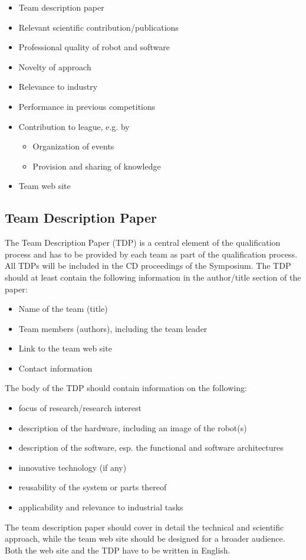 \begin{itemize}

	\item Team description paper
	\item Relevant scientific contribution/publications
	\item Professional quality of robot and software
	\item Novelty of approach
	\item Relevance to industry
	\item Performance in previous competitions
	\item Contribution to \RCAW league, e.g. by
		\begin{itemize}
			\item Organization of events
			\item Provision and sharing of knowledge
		\end{itemize}
	\item Team web site

\end{itemize}

\subsection{Team Description Paper}
The Team Description Paper (TDP) is a central element of the qualification process and has to be provided by each team as part of the qualification process. All TDPs will be included in the CD  proceedings of the \RC Symposium. The TDP should at least contain the following information in the author/title section of the paper:

\begin{itemize}
	\item Name of the team (title)
	\item Team members (authors), including the team leader
	\item Link to the team web site
	\item Contact information
\end{itemize}


The body of the TDP should contain information on the following:

\begin{itemize}
	\item focus of research/research interest
	\item description of the hardware, including an image of the robot(s)
	\item description of the software, esp. the functional and software architectures
	\item innovative technology (if any)
	\item reusability of the system or parts thereof
	\item applicability and relevance to industrial tasks
\end{itemize}


The team description paper should cover in detail the technical and scientific approach, while the team web site should be designed for a broader audience. Both the web site and the TDP have to be written in English.
